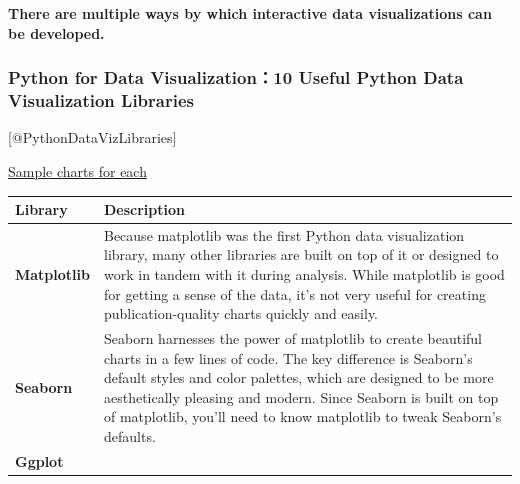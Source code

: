 \documentclass[]{book}
\theoremstyle{definition}
\theoremstyle{definition}
\theoremstyle{definition}
\theoremstyle{remark}
\begin{document}
\textbf{There are multiple ways by which interactive data visualizations
can be developed.}

\subsubsection{Python for Data Visualization：10 Useful Python Data
Visualization
Libraries}\label{python-for-data-visualization10-useful-python-data-visualization-libraries}

{[}@PythonDataVizLibraries{]}

\href{https://blog.modeanalytics.com/python-data-visualization-libraries/}{Sample
charts for each}

\begin{longtable}[]{@{}ll@{}}
\toprule
\begin{minipage}[b]{0.10\columnwidth}\raggedright\strut
Library\strut
\end{minipage} & \begin{minipage}[b]{0.16\columnwidth}\raggedright\strut
Description\strut
\end{minipage}\tabularnewline
\midrule
\endhead
\begin{minipage}[t]{0.10\columnwidth}\raggedright\strut
\textbf{Matplotlib}\strut
\end{minipage} & \begin{minipage}[t]{0.16\columnwidth}\raggedright\strut
Because matplotlib was the first Python data visualization library, many
other libraries are built on top of it or designed to work in tandem
with it during analysis. While matplotlib is good for getting a sense of
the data, it's not very useful for creating publication-quality charts
quickly and easily.\strut
\end{minipage}\tabularnewline
\begin{minipage}[t]{0.10\columnwidth}\raggedright\strut
\textbf{Seaborn}\strut
\end{minipage} & \begin{minipage}[t]{0.16\columnwidth}\raggedright\strut
Seaborn harnesses the power of matplotlib to create beautiful charts in
a few lines of code. The key difference is Seaborn's default styles and
color palettes, which are designed to be more aesthetically pleasing and
modern. Since Seaborn is built on top of matplotlib, you'll need to know
matplotlib to tweak Seaborn's defaults.\strut
\end{minipage}\tabularnewline
\begin{minipage}[t]{0.10\columnwidth}\raggedright\strut
\textbf{Ggplot}\strut

\end{minipage}
\end{longtable}
\end{document}
